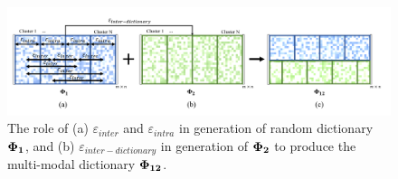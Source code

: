 \begin{figure}[!b]
\centering
\includegraphics[width=1\textwidth,keepaspectratio]{images/Multomodal-Phi.png} %
\centering
\caption{The role of (a) $\varepsilon_{inter}$ and $\varepsilon_{intra}$ in generation of random dictionary $\boldsymbol{\Phi}_{\boldsymbol{1}}$, and (b) $\varepsilon_{inter-dictionary}$ in generation of $\boldsymbol{\Phi}_{\boldsymbol{2}}$ to produce the multi-modal dictionary $\boldsymbol{\Phi}_{\boldsymbol{12}}$.}
\label{fig:Multomodal-Phi}
\end{figure}